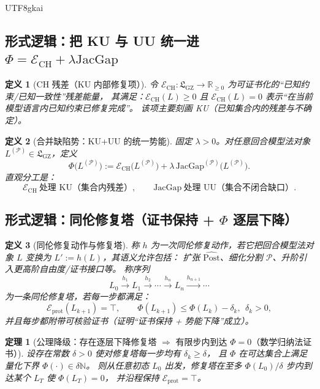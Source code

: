 \documentclass[12pt]{article}
\newtheorem{definition}{定义}[section]
\newtheorem{theorem}{定理}[section]
\newcommand{\RR}{\mathbb{R}}
\newcommand{\NN}{\mathbb{N}}
\newcommand{\GZLS}{\ensuremath{\mathfrak{L}_{\mathrm{GZ}}}}
\newcommand{\JacGap}{\ensuremath{\mathrm{JacGap}}} %
\begin{document}
\begin{CJK*}{UTF8}{gkai}
\subsection{形式逻辑：把 KU 与 UU 统一进 $\Phi=\mathcal{E}_{\mathrm{CH}}+\lambda\JacGap$}
\label{sec:phi-ch-jacgap-split}

\begin{definition}[CH 残差（KU 内部修复项）]
\label{def:ch-energy-ku}
令 $\mathcal{E}_{\mathrm{CH}}:\GZLS\to\RR_{\ge 0}$ 为可证书化的“已知约束/已知一致性”残差能量，
其满足：$\mathcal{E}_{\mathrm{CH}}(L)\ge 0$ 且 $\mathcal{E}_{\mathrm{CH}}(L)=0$ 表示“在当前模型语言内已知约束已修复完成”。
该项主要刻画 KU（已知集合内的残差与不确定）。
\end{definition}

\begin{definition}[合并缺陷势：KU+UU 的统一势能]
\label{def:phi-ch-jacgap}
固定 $\lambda>0$。对任意回合模型法对象 $L^{(\mathcal{P})}\in\GZLS$，定义
\[
  \Phi\!\bigl(L^{(\mathcal{P})}\bigr)
  :=\mathcal{E}_{\mathrm{CH}}\!\bigl(L^{(\mathcal{P})}\bigr)
  +\lambda\,\JacGap^{(\mathcal{P})}\!\bigl(L^{(\mathcal{P})}\bigr).
\]
直观分工是：
\[
  \mathcal{E}_{\mathrm{CH}}\ \text{处理 KU（集合内残差）},\qquad
  \JacGap\ \text{处理 UU（集合不闭合缺口）}.
\]
\end{definition}

\subsection{形式逻辑：同伦修复塔（证书保持 + $\Phi$ 逐层下降）}
\label{sec:homotopy-repair-tower-phi}

\begin{definition}[同伦修复动作与修复塔]
\label{def:homotopy-repair-tower-phi}
称 $h$ 为一次同伦修复动作，若它把回合模型法对象 $L$ 变换为 $L':=h(L)$，其语义允许包括：
扩张 $\widehat{\mathrm{Post}}$、细化分割 $\mathcal{P}$、升阶引入更高阶自由度/证书接口等。
称序列
\[
  L_0 \xrightarrow{h_1} L_1 \xrightarrow{h_2}\cdots\xrightarrow{h_n} L_n \xrightarrow{h_{n+1}}\cdots
\]
为一条同伦修复塔，若每一步都满足：
\[
  \mathcal{E}_{\mathrm{prot}}(L_{k+1})=\top,
  \qquad
  \Phi(L_{k+1})\le \Phi(L_k)-\delta_k,\ \ \delta_k>0,
\]
并且每步都附带可核验证书（证明“证书保持 + 势能下降”成立）。
\end{definition}

\begin{theorem}[公理降级：存在逐层下降修复塔 $\Rightarrow$ 有限步内到达 $\Phi=0$（数学归纳法证书）]
\label{thm:repair-tower-terminates}
设存在常数 $\delta>0$ 使对修复塔每一步均有 $\delta_k\ge \delta$，
且 $\Phi$ 在可达集合上满足量化下界 $\Phi(\cdot)\in \delta\NN$。
则从任意初态 $L_0$ 出发，修复塔在至多 $\Phi(L_0)/\delta$ 步内到达某个 $L_T$ 使 $\Phi(L_T)=0$，
并沿程保持 $\mathcal{E}_{\mathrm{prot}}=\top$。
\end{theorem}


\end{CJK*}
\end{document}
